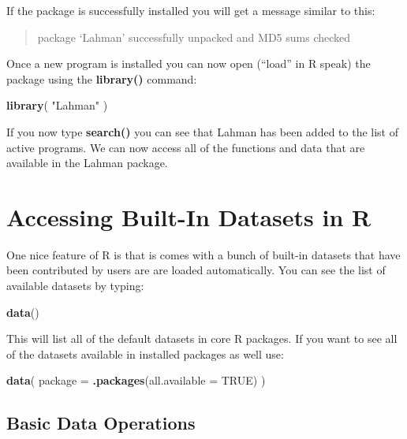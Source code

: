 \documentclass[]{book}
\newenvironment{Shaded}{\begin{snugshade}}{\end{snugshade}}
\newcommand{\DataTypeTok}[1]{\textcolor[rgb]{0.13,0.29,0.53}{#1}}
\newcommand{\KeywordTok}[1]{\textcolor[rgb]{0.13,0.29,0.53}{\textbf{#1}}}
\newcommand{\NormalTok}[1]{#1}
\newcommand{\OtherTok}[1]{\textcolor[rgb]{0.56,0.35,0.01}{#1}}
\newcommand{\StringTok}[1]{\textcolor[rgb]{0.31,0.60,0.02}{#1}}
\theoremstyle{definition}
\theoremstyle{definition}
\theoremstyle{definition}
\theoremstyle{remark}
\begin{document}
If the package is successfully installed you will get a message similar
to this:

\begin{quote}
package `Lahman' successfully unpacked and MD5 sums checked
\end{quote}

Once a new program is installed you can now open (``load'' in R speak)
the package using the \textbf{library()} command:

\begin{Shaded}
\begin{Highlighting}[]
\KeywordTok{library}\NormalTok{( }\StringTok{"Lahman"}\NormalTok{ )}
\end{Highlighting}
\end{Shaded}

If you now type \textbf{search()} you can see that Lahman has been added
to the list of active programs. We can now access all of the functions
and data that are available in the Lahman package.

\hypertarget{accessing-built-in-datasets-in-r}{%
\section{Accessing Built-In Datasets in
R}\label{accessing-built-in-datasets-in-r}}

One nice feature of R is that is comes with a bunch of built-in datasets
that have been contributed by users are are loaded automatically. You
can see the list of available datasets by typing:

\begin{Shaded}
\begin{Highlighting}[]
\KeywordTok{data}\NormalTok{()}
\end{Highlighting}
\end{Shaded}

This will list all of the default datasets in core R packages. If you
want to see all of the datasets available in installed packages as well
use:

\begin{Shaded}
\begin{Highlighting}[]
\KeywordTok{data}\NormalTok{( }\DataTypeTok{package =} \KeywordTok{.packages}\NormalTok{(}\DataTypeTok{all.available =} \OtherTok{TRUE}\NormalTok{) )}
\end{Highlighting}
\end{Shaded}

\hypertarget{basic-data-operations}{%
\subsection{Basic Data Operations}\label{basic-data-operations}}
\end{document}
